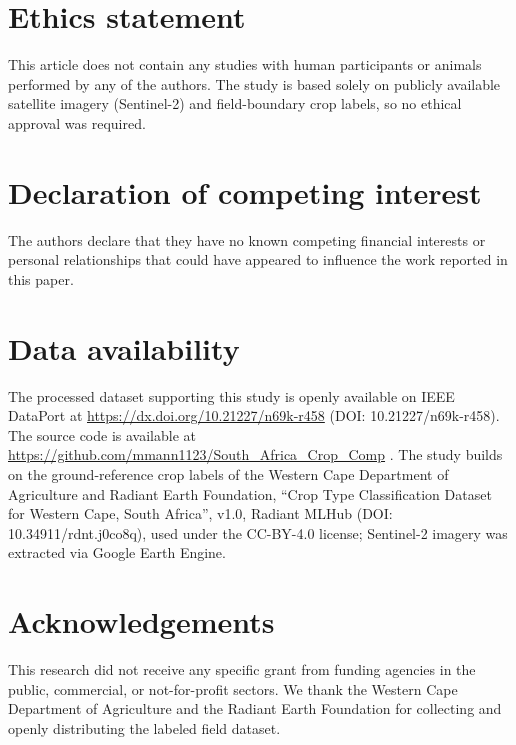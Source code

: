 \documentclass[preprint,authoryear]{elsarticle}
\begin{document}
\section*{Ethics statement}
This article does not contain any studies with human participants or animals performed by any of the authors. The study is based solely on publicly available satellite imagery (Sentinel-2) and field-boundary crop labels, so no ethical approval was required.

\section*{Declaration of competing interest}
The authors declare that they have no known competing financial interests or personal relationships that could have appeared to influence the work reported in this paper.

\section*{Data availability}
The processed dataset supporting this study is openly available on IEEE DataPort at \url{https://dx.doi.org/10.21227/n69k-r458} (DOI: 10.21227/n69k-r458). The source code is available at \url{https://github.com/mmann1123/South_Africa_Crop_Comp} \citep{primary_repo}. The study builds on the ground-reference crop labels of the Western Cape Department of Agriculture and Radiant Earth Foundation, ``Crop Type Classification Dataset for Western Cape, South Africa'', v1.0, Radiant MLHub (DOI: 10.34911/rdnt.j0co8q), used under the CC-BY-4.0 license; Sentinel-2 imagery was extracted via Google Earth Engine.

\section*{Acknowledgements}
This research did not receive any specific grant from funding agencies in the public, commercial, or not-for-profit sectors. We thank the Western Cape Department of Agriculture and the Radiant Earth Foundation for collecting and openly distributing the labeled field dataset.



\end{document}
